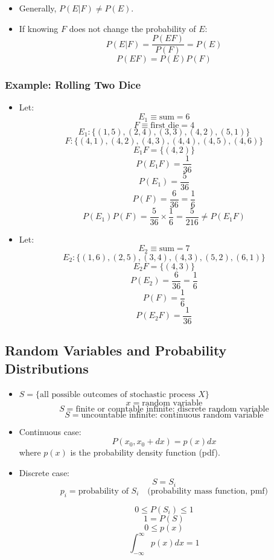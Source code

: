\begin{itemize}
      \item Generally, $P(E|F) \neq P(E)$.
      \item If knowing $F$ does not change the probability of $E$:
            \[ P(E|F) = \frac{P(EF)}{P(F)} = P(E) \]
            \[ \boxed{P(EF) = P(E)P(F)} \]
\end{itemize}

\subsubsection{Example: Rolling Two Dice}

\begin{itemize}
      \item Let:
            \[ E_1 \equiv \text{sum} = 6 \]
            \[ F \equiv \text{first die} = 4 \]
            \[ E_1: \{(1,5), (2,4), (3,3), (4,2), (5,1)\} \]
            \[ F: \{(4,1), (4,2), (4,3), (4,4), (4,5), (4,6)\} \]
            \[ E_1 F = \{(4,2)\} \]
            \[ P(E_1 F) = \frac{1}{36} \]
            \[ P(E_1) = \frac{5}{36} \]
            \[ P(F) = \frac{6}{36}  = \frac{1}{6} \]
            \[ P(E_1) P(F) = \frac{5}{36} \times \frac{1}{6} = \frac{5}{216} \neq P(E_1 F) \]

      \item Let:
            \[ E_2 \equiv \text{sum} = 7 \]
            \[ E_2: \{(1,6), (2,5), (3,4), (4,3), (5,2), (6,1)\} \]
            \[ E_2 F = \{(4,3)\} \]
            \[ P(E_2) = \frac{6}{36} = \frac{1}{6} \]
            \[ P(F) = \frac{1}{6} \]
            \[ P(E_2 F) = \frac{1}{36} \]
\end{itemize}

\subsection{Random Variables and Probability Distributions}

\begin{itemize}
      \item $S = \{ \text{all possible outcomes of stochastic process } X \}$
            \[ x = \text{random variable} \]
            \[ S = \text{finite or countable infinite: discrete random variable} \]
            \[ S = \text{uncountable infinite: continuous random variable} \]

      \item Continuous case:
            \[ P(x_0, x_0 + dx) = p(x) dx \]
            where $p(x)$ is the probability density function (pdf).

      \item Discrete case:
            \[ S = S_i \]
            \[ p_i = \text{probability of } S_i \quad \text{(probability mass function, pmf)} \]

            \[ 0 \leq P(S_i) \leq 1 \]
            \[ 1 = P(S) \]
            \[ 0 \leq p(x) \]
            \[ \int_{-\infty}^{\infty} p(x) dx = 1 \]
\end{itemize}

